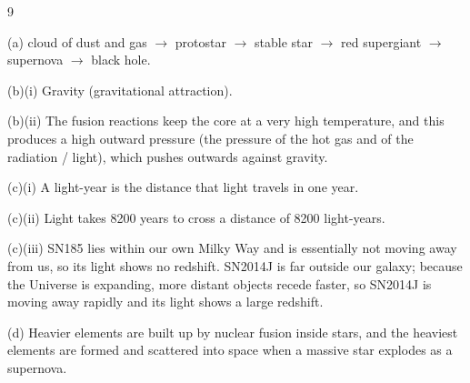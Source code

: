 \begin{question}{9}
\markscheme
{}
\endms

\exemplar
(a) cloud of dust and gas $\rightarrow$ protostar $\rightarrow$ stable star $\rightarrow$ red supergiant $\rightarrow$ supernova $\rightarrow$ black hole.

(b)(i) Gravity (gravitational attraction).

(b)(ii) The fusion reactions keep the core at a very high temperature, and this produces a high outward pressure (the pressure of the hot gas and of the radiation / light), which pushes outwards against gravity.

(c)(i) A light-year is the distance that light travels in one year.

(c)(ii) Light takes 8200 years to cross a distance of 8200 light-years.

(c)(iii) SN185 lies within our own Milky Way and is essentially not moving away from us, so its light shows no redshift. SN2014J is far outside our galaxy; because the Universe is expanding, more distant objects recede faster, so SN2014J is moving away rapidly and its light shows a large redshift.

(d) Heavier elements are built up by nuclear fusion inside stars, and the heaviest elements are formed and scattered into space when a massive star explodes as a supernova.
\endexemplar
\end{question}